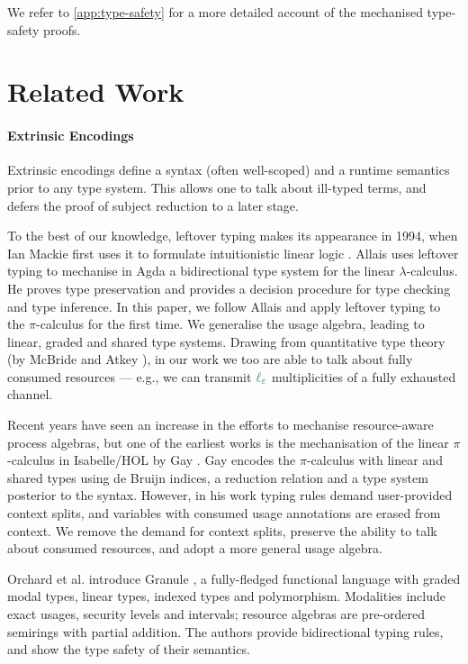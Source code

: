\documentclass[]{llncs}
\newcommand{\lambdacalc}{$\lambda$-calculus}
\newcommand{\picalc}{$\pi$-calculus}
\newcommand{\func}[1]{\textcolor{teal}{\operatorname{#1}}}
\newcommand{\lz}{\func{\ell_{\varepsilon}}}
\begin{document}
We refer to \autoref{app:type-safety}  for a more detailed account of the mechanised type-safety proofs.

\section{Related Work}

\paragraph*{Extrinsic Encodings}

Extrinsic encodings define a syntax (often well-scoped) and a runtime semantics prior to any type system.
This allows one to talk about ill-typed terms, and defers the proof of subject reduction to a later stage.

To the best of our knowledge, leftover typing makes its appearance in 1994, when Ian Mackie first uses it to formulate intuitionistic linear logic \cite{Mackie}.
Allais \cite{Allais2018a} uses leftover typing to mechanise in Agda a bidirectional type system for the linear \lambdacalc{}.
He proves type preservation and provides a decision procedure for type checking and type inference.
In this paper, we follow Allais \cite{Allais2018a} and apply leftover typing to the \picalc{} for the first time.
We generalise the usage algebra, leading to linear, graded and shared type systems.
Drawing from quantitative type theory (by McBride and Atkey \cite{McBride2016,Atkey2018}), in our work we too are able to talk about fully consumed resources --- e.g., we can transmit $\lz$ multiplicities of a fully exhausted channel.

Recent years have seen an increase in the efforts to mechanise resource-aware process algebras, but one of the earliest works is the mechanisation of the linear \picalc{} in Isabelle/HOL by Gay \cite{Gay2001}.
Gay encodes the \picalc{} with linear and shared types using de Bruijn indices, a reduction relation and a type system posterior to the syntax.
However, in his work typing rules demand user-provided context splits, and variables with consumed usage annotations are erased from context.
We remove the demand for context splits, preserve the ability to talk about consumed resources, and adopt a more general usage algebra.

Orchard et al. introduce Granule \cite{Orchard}, a fully-fledged functional language with graded modal types, linear types, indexed types and polymorphism.
Modalities include exact usages, security levels and intervals; resource algebras are pre-ordered semirings with partial addition.
The authors provide bidirectional typing rules, and show the type safety of their semantics.
\end{document}
